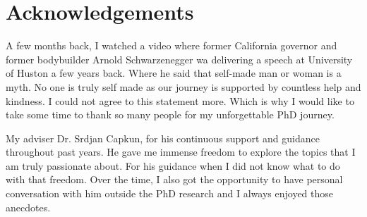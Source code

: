 
\bigskip

\begingroup
\let\clearpage\relax
\let\cleardoublepage\relax
\let\cleardoublepage\relax
\chapter*{Acknowledgements}

\def\thanks#1{%
\begingroup
\leftskip1em
\noindent #1
\par
\endgroup
}

A few months back, I watched a video where former California governor and former bodybuilder Arnold Schwarzenegger wa delivering a speech at University of Huston a few years back. Where he said that self-made man or woman is a myth. No one is truly self made as our journey is supported by countless help and kindness. I could not agree to this statement more. Which is why I would like to take some time to thank so many people for my unforgettable PhD journey.

My adviser Dr. Srdjan Capkun, for his continuous support and guidance throughout past years. He gave me immense freedom to explore the topics that I am truly passionate about. For his guidance when I did not know what to do with that freedom. Over the time, I also got the opportunity to have personal conversation with him outside the PhD research and I always enjoyed those anecdotes.


\endgroup

